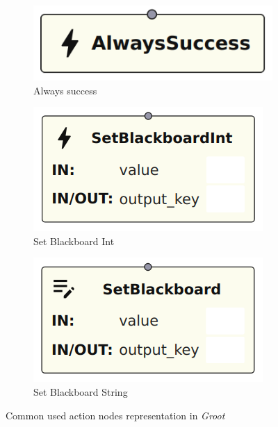 \begin{figure}[!h]
    \centering
    \begin{subfigure}[b]{.32\linewidth}
        \centering
        \includegraphics[width=0.7\linewidth]{images/implementation/AlwaysSuccessNode.png}
        \caption{Always success}
    \end{subfigure}
    \hfill
    \begin{subfigure}[b]{.32\linewidth}
        \centering
        \includegraphics[width=0.85\linewidth]{images/implementation/SetBlackboardIntNode.png}
        \caption{Set Blackboard Int}
        \label{fig:set_blackboard_int_impl}
    \end{subfigure}
    \hfill
    \begin{subfigure}[b]{.32\linewidth}
        \centering
        \includegraphics[width=0.85\linewidth]{images/implementation/SetBlackboardStringNode.png}
        \caption{Set Blackboard String}
        \label{fig:set_blackboard_string_impl}
    \end{subfigure}
    \caption{Common used action nodes representation in \textit{Groot}}
    \label{fig:common_action_node_impl}
\end{figure}

